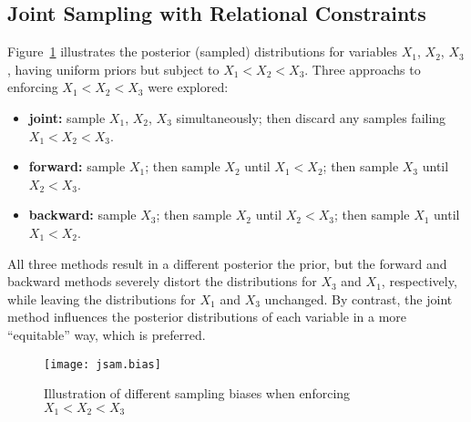 \subsection{Joint Sampling with Relational Constraints}\label{app.model.math.jsam}
Figure~\ref{fig:jsam.bias} illustrates the posterior (sampled) distributions
for variables $X_1$, $X_2$, $X_3$, having uniform priors but subject to $X_1 < X_2 < X_3$.
Three approachs to enforcing $X_1 < X_2 < X_3$ were explored:
\begin{itemize}
  \item \textbf{joint:}
    sample $X_1$, $X_2$, $X_3$ simultaneously;
    then discard any samples failing $X_1 < X_2 < X_3$.
  \item \textbf{forward:}
    sample $X_1$;
    then sample $X_2$ until $X_1 < X_2$;
    then sample $X_3$ until $X_2 < X_3$.
  \item \textbf{backward:}
    sample $X_3$;
    then sample $X_2$ until $X_2 < X_3$;
    then sample $X_1$ until $X_1 < X_2$.
\end{itemize}
All three methods result in a different posterior \vs the prior,
but the forward and backward methods
severely distort the distributions for $X_3$ and $X_1$, respectively,
while leaving the distributions for $X_1$ and $X_3$ unchanged.
By contrast, the joint method influences the posterior distributions of each variable
in a more ``equitable'' way, which is preferred.
\begin{figure}[h]
  \centering
  \texttt{[image: jsam.bias]}
  \caption{Illustration of different sampling biases when enforcing $X_1 < X_2 < X_3$}
  \label{fig:jsam.bias}
\end{figure}
